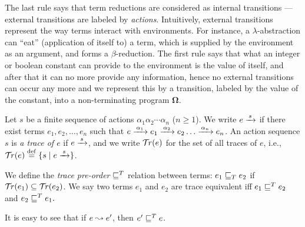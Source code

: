 \documentclass[10pt,a4]{article}
\begin{document}
The last rule says that term reductions are considered as internal transitions ---
external transitions are labeled by {\em actions}. 
Intuitively, external transitions represent the way terms interact with environments. 
For instance, a $\lambda$-abstraction can ``eat'' (application of itself to) a term, 
which is supplied by the environment as an argument, and forms a $\beta$-reduction.
The first rule says that what 
an integer or boolean constant can provide to the environment is the value of itself, 
and after that it can no more provide any information, hence no external transitions 
can occur any more and we represent this by a transition, labeled by the value of 
the constant, into a non-terminating program $\pmb{\Omega}$. 

Let $s$ be a finite sequence of actions $\alpha_1 \alpha_2 \cdots \alpha_n$ ($n \geq 1$). 
We write $e \xrightarrow{\,{s}\,}$ if there exist terms $e_1, e_2, \ldots , e_n$ such that 
$e \xrightarrow{\,{\alpha_1}\,} e_1 \xrightarrow{\,{\alpha_2}\,} e_2 \dots \xrightarrow{\,{\alpha_n}\,} e_n$. 
An action sequence $s$ is {\em a trace of $e$} if $e \xrightarrow{\,{s}\,}$, and we write 
$\mathcal{T}\!\mathit{r}(e)$ for the set of all traces of $e$, i.e., $\mathcal{T}\!\mathit{r}(e) \stackrel{\mathrm{def}}{=} \{{s \mid e \xrightarrow{\,{s}\,}}\}$.

We define the {\em trace pre-order} $\sqsubseteq^T$ relation between terms: $e_1 \sqsubseteq_T e_2$ if 
$\mathcal{T}\!\mathit{r}(e_1) \subseteq \mathcal{T}\!\mathit{r}(e_2)$. 
We say two terms $e_1$ and $e_2$ are trace equivalent iff $e_1 \sqsubseteq^T e_2$ and 
$e_2 \sqsubseteq^T e_1.$

It is easy to see that if $e \leadsto e'$, then $e' \sqsubseteq^T e$.
\end{document}

